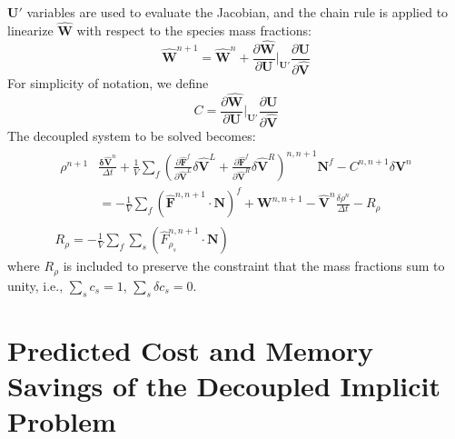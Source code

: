 $\mathbf{U}'$ variables are used to evaluate the Jacobian, and the chain rule is
applied to linearize $\mathbf{\hat{W}}$ with respect to the species mass
fractions:
\begin{equation}
  \mathbf{\hat{W}}^{n+1} = \mathbf{\hat{W}}^n+\frac{\partial
  \mathbf{\hat{W}}}{\partial \mathbf{U}}\bigg|_{\mathbf{U}'} \frac{\partial
  \mathbf{U}}{\partial \mathbf{\hat{V}}} 
\end{equation}
For simplicity of notation, we define
\begin{equation}
  C = \frac{\partial \mathbf{\hat{W}}}{\partial
  \mathbf{U}}\bigg|_{\mathbf{U}'} \frac{\partial \mathbf{U}}{\partial
  \mathbf{\hat{V}}}
\end{equation}
The decoupled system to be solved becomes:
\begin{gather} 
  \begin{split}
    \rho^{n+1}&\frac{\mathbf{\delta \hat{V}}^n}{\Delta t}
    +\frac{1}{V}\sum\limits_{f}(\frac{\partial \mathbf{\hat{F}}^f}{\partial
    \mathbf{\hat{V}}^L}\delta	\mathbf{\hat{V}}^L
    +\frac{\partial \mathbf{\hat{F}}^f}{\partial \mathbf{\hat{V}}^R}\delta
    \mathbf{\hat{V}}^R)^{n, n+1}\mathbf{N}^f - C^{n, n+1}\delta\mathbf{V}^n \\
    &= -\frac{1}{V}\sum\limits_{f}(\mathbf{\hat{F}}^{n,n+1}\cdot\mathbf{N})^f +
    \mathbf{W}^{n, n+1} -\mathbf{\hat{V}}^n\frac{\delta \rho^n}{\Delta t} -
    R_\rho
  \end{split} \\ 
  R_\rho = -\frac{1}{V}\sum\limits_{f}{\sum\limits_{s}
  {(\hat{F}_{\rho_s}^{n,n+1}\cdot\mathbf{N})}}
\end{gather}
where $R_\rho$ is included to preserve the constraint that the mass fractions
sum to unity, i.e., $\sum\limits_{s}{c_s}=1$, $\sum\limits_{s}{\delta
c_s}=0$.

\section{Predicted Cost and Memory Savings of the Decoupled Implicit Problem}
\label{sec:predicted-cost-mem-savings}

